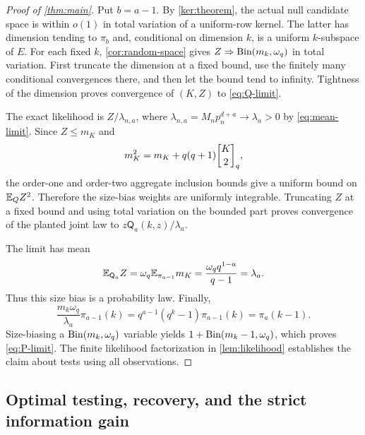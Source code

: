\begin{proof}[Proof of \cref{thm:main}]
Put $b=a-1$. By \cref{ker:theorem}, the actual null candidate space is
within $o(1)$ in total variation of a uniform-row kernel. The latter has
dimension tending to $\pi_b$ and, conditional on dimension $k$, is a
uniform $k$-subspace of $E$. For each fixed $k$, \cref{cor:random-space}
gives $Z\Rightarrow\operatorname{Bin}(m_k,\omega_q)$ in total variation. First truncate
the dimension at a fixed bound, use the finitely many conditional
convergences there, and then let the bound tend to infinity. Tightness of
the dimension proves convergence of $(K,Z)$ to \eqref{eq:Q-limit}.

The exact likelihood is $Z/\lambda_{n,a}$, where
$\lambda_{n,a}=M_np_n^{d+a}\to\lambda_a>0$ by
\eqref{eq:mean-limit}. Since $Z\le m_K$ and
\begin{equation}
 m_K^2=m_K+q(q+1)\qbinom K2,
 \label{eq:second-point-moment}
\end{equation}
the order-one and order-two aggregate inclusion bounds give a uniform
bound on $\mathbb E_Q Z^2$. Therefore the size-bias weights are uniformly
integrable. Truncating $Z$ at a fixed bound and using total variation on
the bounded part proves convergence of the planted joint law to
$z\mathsf Q_a(k,z)/\lambda_a$.

The limit has mean
\[
 \mathbb E_{\mathsf Q_a}Z
 =\omega_q\mathbb E_{\pi_{a-1}}m_K
 =\frac{\omega_qq^{1-a}}{q-1}=\lambda_a.
\]
Thus this size bias is a probability law. Finally,
\begin{equation}
 \frac{m_k\omega_q}{\lambda_a}\pi_{a-1}(k)
 =q^{a-1}(q^k-1)\pi_{a-1}(k)
 =\pi_a(k-1).
 \label{eq:dimension-sizebias}
\end{equation}
Size-biasing a $\operatorname{Bin}(m_k,\omega_q)$ variable yields
$1+\operatorname{Bin}(m_k-1,\omega_q)$, which proves \eqref{eq:P-limit}.
The finite likelihood factorization in \cref{lem:likelihood} establishes
the claim about tests using all observations.
\end{proof}

\subsection{Optimal testing, recovery, and the strict information gain}

